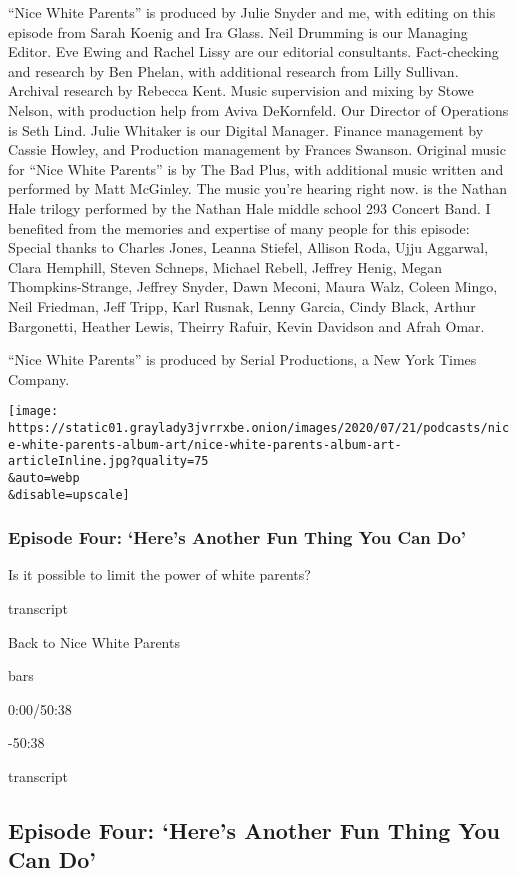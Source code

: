 ``Nice White Parents'' is produced by Julie Snyder and me, with editing
on this episode from Sarah Koenig and Ira Glass. Neil Drumming is our
Managing Editor. Eve Ewing and Rachel Lissy are our editorial
consultants. Fact-checking and research by Ben Phelan, with additional
research from Lilly Sullivan. Archival research by Rebecca Kent. Music
supervision and mixing by Stowe Nelson, with production help from Aviva
DeKornfeld. Our Director of Operations is Seth Lind. Julie Whitaker is
our Digital Manager. Finance management by Cassie Howley, and Production
management by Frances Swanson. Original music for ``Nice White Parents''
is by The Bad Plus, with additional music written and performed by Matt
McGinley. The music you're hearing right now. is the Nathan Hale trilogy
performed by the Nathan Hale middle school 293 Concert Band. I benefited
from the memories and expertise of many people for this episode: Special
thanks to Charles Jones, Leanna Stiefel, Allison Roda, Ujju Aggarwal,
Clara Hemphill, Steven Schneps, Michael Rebell, Jeffrey Henig, Megan
Thompkins-Strange, Jeffrey Snyder, Dawn Meconi, Maura Walz, Coleen
Mingo, Neil Friedman, Jeff Tripp, Karl Rusnak, Lenny Garcia, Cindy
Black, Arthur Bargonetti, Heather Lewis, Theirry Rafuir, Kevin Davidson
and Afrah Omar.

``Nice White Parents'' is produced by Serial Productions, a New York
Times Company.

\texttt{[image: https://static01.graylady3jvrrxbe.onion/images/2020/07/21/podcasts/nice-white-parents-album-art/nice-white-parents-album-art-articleInline.jpg?quality=75\\\&auto=webp\\\&disable=upscale]}

\hypertarget{episode-four-heres-another-fun-thing-you-can-do}{%
\subsubsection{Episode Four: `Here's Another Fun Thing You Can
Do'}\label{episode-four-heres-another-fun-thing-you-can-do}}

Is it possible to limit the power of white parents?

transcript

Back to Nice White Parents

bars

0:00/50:38

-50:38

transcript

\hypertarget{episode-four-heres-another-fun-thing-you-can-do-1}{%
\subsection{Episode Four: `Here's Another Fun Thing You Can
Do'}\label{episode-four-heres-another-fun-thing-you-can-do-1}}

